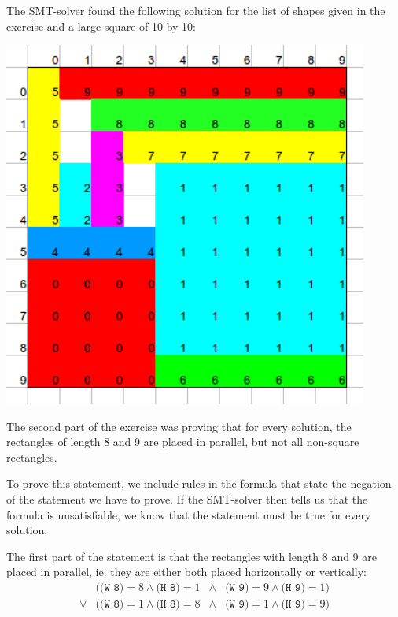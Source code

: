 \documentclass[12pt]{article}
\begin{document}
The SMT-solver found the following solution for the list of shapes given in the exercise and a large square of 10 by 10:\\
\begin{center}
    \includegraphics[width=12cm]{rectangles.png}
\end{center}

The second part of the exercise was proving that for every solution, 
the rectangles of length 8 and 9 are placed in parallel, 
but not all non-square rectangles. 

To prove this statement, we include rules in the formula 
that state the negation of the statement we have to prove.
If the SMT-solver then tells us that the formula is unsatisfiable, we know that the statement must be true for every solution. 


The first part of the statement is that the rectangles with length 8 and 9 are placed in parallel, 
ie. they are either both placed horizontally or vertically:\\
\[
    \begin{array}{rlcl}
    & (\texttt{(W 8)} = 8 \wedge \texttt{(H 8)} = 1 & \wedge & \texttt{(W 9)} = 9 \wedge \texttt{(H 9)} = 1) \\
    \vee & (\texttt{(W 8)} = 1 \wedge \texttt{(H 8)} = 8 & \wedge & \texttt{(W 9)} = 1 \wedge \texttt{(H 9)} = 9)
    \end{array}
\]
\end{document}
